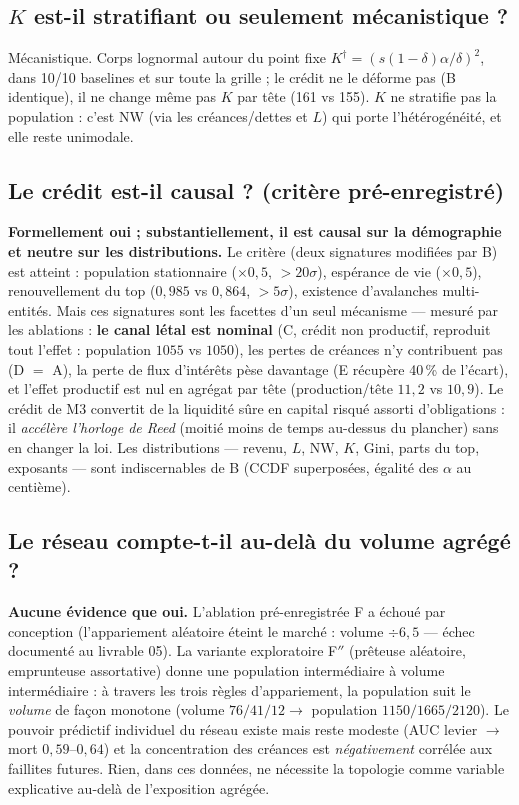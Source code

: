 \documentclass[11pt,a4paper]{article}
\newcommand{\NW}{\mathrm{NW}}
\begin{document}
\subsection{$K$ est-il stratifiant ou seulement mécanistique ?}
Mécanistique. Corps lognormal autour du point fixe
$K^\dagger = (s(1-\delta)\alpha/\delta)^2$, dans 10/10 baselines et sur
toute la grille ; le crédit ne le déforme pas (B identique), il ne change
même pas $K$ par tête (161 vs 155). $K$ ne stratifie pas la population :
c'est $\NW$ (via les créances/dettes et $L$) qui porte l'hétérogénéité, et
elle reste unimodale.

\subsection{Le crédit est-il causal ? (critère pré-enregistré)}
\textbf{Formellement oui ; substantiellement, il est causal sur la
démographie et neutre sur les distributions.} Le critère (deux signatures
modifiées par B) est atteint : population stationnaire ($\times 0{,}5$,
$> 20\sigma$), espérance de vie ($\times 0{,}5$), renouvellement du top
($0{,}985$ vs $0{,}864$, $> 5\sigma$), existence d'avalanches
multi-entités. Mais ces signatures sont les facettes d'un seul mécanisme —
mesuré par les ablations : \textbf{le canal létal est nominal} (C, crédit
non productif, reproduit tout l'effet : population $1055$ vs $1050$), les
pertes de créances n'y contribuent pas (D $=$ A), la perte de flux
d'intérêts pèse davantage (E récupère 40\,\% de l'écart), et l'effet
productif est nul en agrégat par tête (production/tête $11{,}2$ vs
$10{,}9$). Le crédit de M3 convertit de la liquidité sûre en capital
risqué assorti d'obligations : il \emph{accélère l'horloge de Reed} (moitié
moins de temps au-dessus du plancher) sans en changer la loi. Les
distributions — revenu, $L$, $\NW$, $K$, Gini, parts du top, exposants —
sont indiscernables de B (CCDF superposées, égalité des $\alpha$ au
centième).

\subsection{Le réseau compte-t-il au-delà du volume agrégé ?}
\textbf{Aucune évidence que oui.} L'ablation pré-enregistrée F a échoué par
conception (l'appariement aléatoire éteint le marché : volume $\div 6{,}5$
— échec documenté au livrable 05). La variante exploratoire F$''$
(prêteuse aléatoire, emprunteuse assortative) donne une population
intermédiaire à volume intermédiaire : à travers les trois règles
d'appariement, la population suit le \emph{volume} de façon monotone
(volume $76/41/12 \to$ population $1150/1665/2120$). Le pouvoir prédictif
individuel du réseau existe mais reste modeste (AUC levier $\to$ mort
$0{,}59$--$0{,}64$) et la concentration des créances est \emph{négativement}
corrélée aux faillites futures. Rien, dans ces données, ne nécessite la
topologie comme variable explicative au-delà de l'exposition agrégée.
\end{document}
